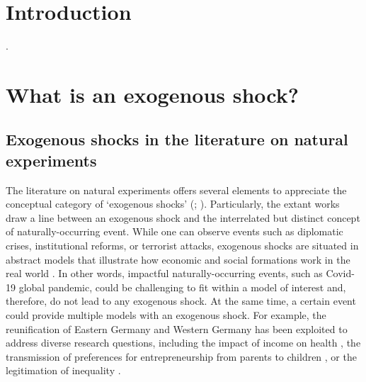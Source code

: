 \clearpage

\begin{refsection}

\section{Introduction}
\label{sec:introduction}

%
.

\section{What is an exogenous shock?}
\label{sec:what_exogenous_shocks}

\subsection{Exogenous shocks in the literature on natural experiments}
\label{subsec:exogenous_shocks_and_ne}

\noindent The literature on natural experiments offers several elements to
appreciate the conceptual category of `exogenous shocks' (\cite[for an overview
of the natural experiment design, see for example][]{withers_li_2021,
dunning_2012,craig_et_al_2017,keele_et_al_2016}; \cite[for a review of the
application of this design, see][]{sekhon_titiunik_2012,sieweke_santoni_2020,
roseinzweig_et_al_2000}). Particularly, the extant works draw a line between an
exogenous shock and the interrelated but distinct concept of naturally-occurring
event. While one can observe events such as diplomatic crises, institutional
reforms, or terrorist attacks, exogenous shocks are situated in abstract models
that illustrate how economic and social formations work in the real world
\parencite{morgan_2012}. In other words, impactful naturally-occurring events,
such as Covid-19 global pandemic, could be challenging to fit within a model of
interest and, therefore, do not lead to any exogenous shock. At the same time, a
certain event could provide multiple models with an exogenous shock.  For
example, the reunification of Eastern Germany and Western Germany has been
exploited to address diverse research questions, including the impact of income
on health \parencite[e.g.][]{frijters_et_al_2004}, the transmission of
preferences for entrepreneurship from parents to children
\parencite[e.g.][]{wyrwich_2015}, or the legitimation of inequality
\parencite[e.g.][]{haack_sieweke_2018}.


\end{refsection}
